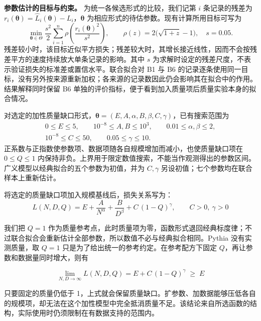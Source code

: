 \textbf{参数估计的目标与约束。}
为统一各候选形式的比较，我们记第 $i$ 条记录的残差为 $r_i(\bm\theta)=\hat L_i(\bm\theta)-L_i$，$\bm\theta$ 为相应形式的待估参数。现有计算所用目标可写为
\begin{equation}
  \min_{\bm\theta\in\Theta}
  \frac{s^2}{2}\sum_{i=1}^{n}
  \rho\!\left(\frac{r_i(\bm\theta)^2}{s^2}\right),
  \qquad \rho(z)=2\bigl(\sqrt{1+z}-1\bigr),\quad s=0.05.
  \label{eq:q2_expand_objective}
\end{equation}
残差较小时，该目标近似平方损失；残差较大时，其增长接近线性，因而不会按残差平方的速度持续放大单条记录的影响。其中 $s$ 为求解时设定的残差尺度，不表示验证损失的标准差或置信水平。联合拟合对 B1 与 B6 的记录逐条使用同一目标，没有另外按来源重新加权；各来源的记录数因此仍会影响其在拟合中的作用。结果解释同时保留 B6 单独的评价指标，便于看到加入质量项后质量实验本身的拟合情况。

对选定的加性质量缺口形式，$\bm\theta=(E,A,\alpha,B,\beta,C,\gamma)$，已有搜索范围为
\begin{equation}
  \begin{gathered}
    0\leq E\leq5,\qquad 10^{-8}\leq A,B\leq10^3,\qquad
    0.01\leq\alpha,\beta\leq2,\\
    10^{-8}\leq C\leq50,\qquad 0.05\leq\gamma\leq10.
  \end{gathered}
  \label{eq:q2_expand_bounds}
\end{equation}
正系数与正指数使参数项、数据项随各自规模增加而减小，也使质量缺口项在 $0\leq Q\leq1$ 内保持非负。上界用于限定数值搜索，不能当作观测得出的参数区间。广义模型以经典拟合的五个参数为初值，并为 $C,\gamma$ 另设初值；七个参数均在联合样本上重新估计。

将选定的质量缺口项加入规模基线后，损失关系写为：
\begin{equation}
    L(N,D,Q) = E + \frac{A}{N^{\alpha}} + \frac{B}{D^{\beta}} + C\,(1-Q)^{\gamma},
    \qquad C>0,\ \gamma>0
\end{equation}
\begin{samepage}
我们把 $Q=1$ 作为质量参考点，此时质量项为零，函数形式退回经典标度律；不过联合拟合会重新估计全部参数，所以数值不必与经典拟合相同。Pythia 没有实测质量，取 $Q=1$ 只是为了给出统一的参考约定。在参考配方下固定 $Q$，再让参数和数据量同时增大，则有
\par\nopagebreak[4]
\begin{equation}
    \lim_{N,D\to\infty} L(N,D,Q) = E + C\,(1-Q)^{\gamma} \;\ge\; E
\end{equation}
\end{samepage}
只要固定的质量仍低于 1，上式就会保留质量缺口。扩参数、加数据能够压低各自的规模项，却无法在这个加性模型中完全抵消质量不足。该结论来自所选函数的结构，实际使用时仍须限制在有数据支持的范围内。

